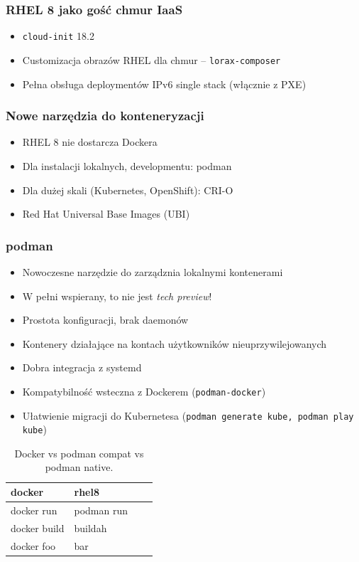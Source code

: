 \documentclass[dvipsnames,table]{beamer}
\begin{document}

%

\begin{frame}
	\frametitle{RHEL 8 jako gość chmur IaaS}
\begin{itemize}
	\item {\tt cloud-init} 18.2
	\item Customizacja obrazów RHEL dla chmur -- {\tt lorax-composer}
	\item Pełna obsługa deploymentów IPv6 single stack (włącznie z PXE)
\end{itemize}
\end{frame}

\begin{frame}
	\frametitle{Nowe narzędzia do konteneryzacji}
\begin{itemize}
	\item RHEL 8 nie dostarcza Dockera
	\item Dla instalacji lokalnych, developmentu: podman
	\item Dla dużej skali (Kubernetes, OpenShift): CRI-O
	\item Red Hat Universal Base Images (UBI)
\end{itemize}
\end{frame}

\begin{frame}
	\frametitle{podman}
	\begin{itemize}
		\item Nowoczesne narzędzie do zarządznia lokalnymi kontenerami
		\item W pełni wspierany, to nie jest {\em tech preview}!
		\item Prostota konfiguracji, brak daemonów
		\item Kontenery działające na kontach użytkowników nieuprzywilejowanych
		\item Dobra integracja z systemd
		\item Kompatybilność wsteczna z Dockerem ({\tt podman-docker})
		\item Ułatwienie migracji do Kubernetesa ({\tt podman generate kube, podman play kube})
	\end{itemize}
\centering
	\begin{table}
\caption{Docker vs podman compat vs podman native.}
\label{porownanie}
\scriptsize
\begin{tabular}{llll}
\hline
docker & rhel8    \\ \hline
docker run & podman run \\
docker build & buildah  \\
docker foo & bar \\ \hline
\end{tabular}
\normalsize
\end{table}
\end{frame}
\end{document}
